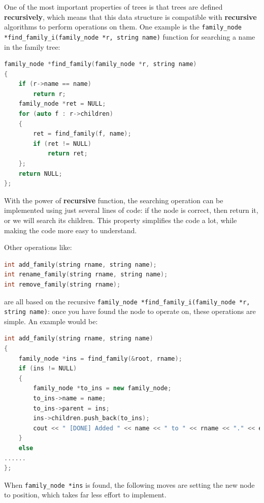 \documentclass[cn,black,12pt,normal]{elegantnote}
\begin{document}
One of the most important properties of trees is that trees are defined \textbf{recursively}, which means that this data structure is compatible with \textbf{recursive} algorithms to perform operations on them. One example is the \lstinline{family_node *find_family_i(family_node *r, string name)} function for searching a name in the family tree: 
\begin{lstlisting}[language = C++]
family_node *find_family(family_node *r, string name)
{
	if (r->name == name)
		return r;
	family_node *ret = NULL;
	for (auto f : r->children)
	{
		ret = find_family(f, name);
		if (ret != NULL)
			return ret;
	};
	return NULL;
};
\end{lstlisting}
With the power of \textbf{recursive} function, the searching operation can be implemented using just several lines of code: if the node is correct, then return it, or we will search its children. This property simplifies the code a lot, while making the code more easy to understand.

Other operations like: 
\begin{lstlisting}[language = C++]
int add_family(string rname, string name);
int rename_family(string rname, string name);
int remove_family(string rname);
\end{lstlisting}
are all based on the recursive \lstinline{family_node *find_family_i(family_node *r, string name)}: once you have found the node to operate on, these operations are simple. An example would be:
\begin{lstlisting}[language = C++]
int add_family(string rname, string name)
{
	family_node *ins = find_family(&root, rname);
	if (ins != NULL)
	{
		family_node *to_ins = new family_node;
		to_ins->name = name;
		to_ins->parent = ins;
		ins->children.push_back(to_ins);
		cout << " [DONE] Added " << name << " to " << rname << "." << endl;
	}
	else
......
};
\end{lstlisting}
When \lstinline{family_node *ins} is found, the following moves are setting the new node to position, which takes far less effort to implement.
\end{document}
